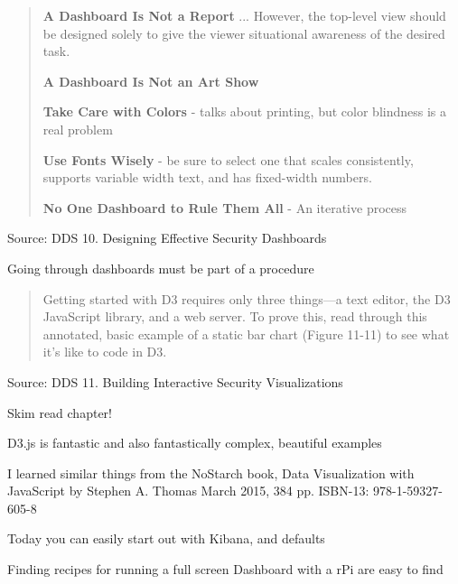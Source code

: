 \documentclass[Screen16to9,17pt]{foils}
\begin{document}
\begin{quote}
  \begin{list2}
  \item {\bf A Dashboard Is Not a Report} ... However, the top-level view should be designed solely to give the viewer situational awareness
  of the desired task.
  \item {\bf A Dashboard Is Not an Art Show}
  \item {\bf Take Care with Colors} - talks about printing, but color blindness is a real problem
  \item {\bf Use Fonts Wisely} - be sure to select one that scales consistently, supports variable width text, and has fixed-width numbers.
  \item {\bf No One Dashboard to Rule Them All} - An iterative process
  \end{list2}
\end{quote}
Source: DDS 10. Designing Effective Security Dashboards

\hskip 2cm
\centerline{\Large Going through dashboards must be part of a procedure}



\begin{quote}
  Getting started with D3 requires only three things—a text editor, the D3 JavaScript library, and
  a web server. To prove this, read through this annotated, basic example of a static bar chart (Figure
  11-11) to see what it’s like to code in D3.
\end{quote}
Source: DDS 11. Building Interactive Security Visualizations

\begin{list2}
\item Skim read chapter!
\item D3.js is fantastic and also fantastically complex, beautiful examples 
\item I learned similar things from the NoStarch book, Data Visualization with JavaScript
by Stephen A. Thomas March 2015, 384 pp. ISBN-13: 978-1-59327-605-8 \\
\item Today you can easily start out with Kibana, and defaults
\item Finding recipes for running a full screen Dashboard with a rPi are easy to find
\end{list2}
\end{document}
